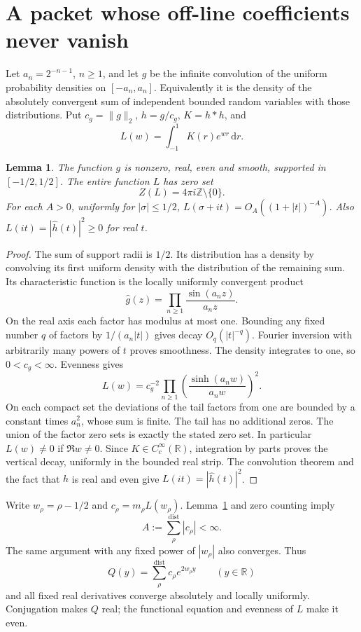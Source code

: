 \documentclass[11pt]{article}
\newtheorem{lemma}[theorem]{Lemma}
\theoremstyle{remark}\newtheorem{remark}[theorem]{Remark}
\newcommand{\R}{\mathbb R}
\newcommand{\Z}{\mathbb Z}
\newcommand{\dd}{\,\mathrm d}
\newcommand{\dist}{\mathrm{dist}}
\begin{document}
\section{A packet whose off-line coefficients never vanish}
Let $a_n=2^{-n-1}$, $n\ge1$, and let $g$ be the infinite convolution of
the uniform probability densities on $[-a_n,a_n]$. Equivalently it is
the density of the absolutely convergent sum of independent bounded
random variables with those distributions. Put $c_g=\|g\|_2$,
$h=g/c_g$, $K=h*h$, and
\[
 L(w)=\int_{-1}^{1}K(r)e^{wr}\dd r.
\]

\begin{lemma}\label{lem:packet}
The function $g$ is nonzero, real, even and smooth, supported in
$[-1/2,1/2]$. The entire function $L$ has zero set
\[
 Z(L)=4\pi i\Z\setminus\{0\}.
\]
For each $A>0$, uniformly for $|\sigma|\le1/2$,
$L(\sigma+it)=O_A((1+|t|)^{-A})$. Also
$L(it)=|\widehat h(t)|^2\ge0$ for real $t$.
\end{lemma}
\begin{proof}
The sum of support radii is $1/2$. Its distribution has a density by
convolving its first uniform density with the distribution of the
remaining sum. Its characteristic function is the locally uniformly
convergent product
\[
 \widehat g(z)=\prod_{n\ge1}\frac{\sin(a_nz)}{a_nz}.
\]
On the real axis each factor has modulus at most one. Bounding any
fixed number $q$ of factors by $1/(a_n|t|)$ gives decay $O_q(|t|^{-q})$.
Fourier inversion with arbitrarily many powers of $t$ proves smoothness.
The density integrates to one, so $0<c_g<\infty$.
Evenness gives
\[
 L(w)=c_g^{-2}\prod_{n\ge1}
      \left(\frac{\sinh(a_nw)}{a_nw}\right)^2.
\]
On each compact set the deviations of the tail factors from one are
bounded by a constant times $a_n^2$, whose sum is finite. The tail has
no additional zeros. The union of the factor zero sets is exactly the
stated zero set. In particular $L(w)\ne0$ if $\Re w\ne0$.
Since $K\in C_c^\infty(\R)$, integration by parts proves the vertical
decay, uniformly in the bounded real strip. The convolution theorem
and the fact that $h$ is real and even give $L(it)=|\widehat h(t)|^2$.
\end{proof}

Write $w_\rho=\rho-1/2$ and $c_\rho=m_\rho L(w_\rho)$.
Lemma~\ref{lem:packet} and zero counting imply
\[
 A:=\sum_\rho^\dist|c_\rho|<\infty.
\]
The same argument with any fixed power of $|w_\rho|$ also converges.
Thus
\[
 Q(y)=\sum_\rho^\dist c_\rho e^{2w_\rho y}\qquad(y\in\R)
\]
and all fixed real derivatives converge absolutely and locally uniformly.
Conjugation makes $Q$ real; the functional equation and evenness of $L$
make it even.
\end{document}
